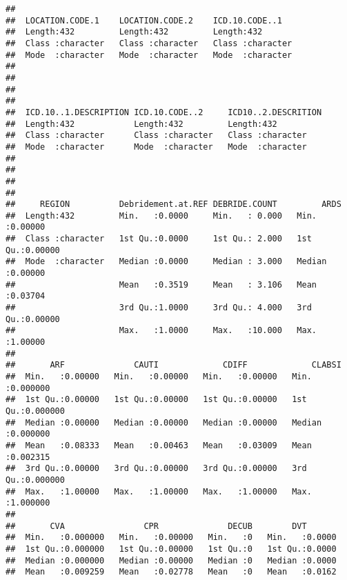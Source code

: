\documentclass[]{article}
\begin{document}
\begin{verbatim}
##                                                          
##  LOCATION.CODE.1    LOCATION.CODE.2    ICD.10.CODE..1    
##  Length:432         Length:432         Length:432        
##  Class :character   Class :character   Class :character  
##  Mode  :character   Mode  :character   Mode  :character  
##                                                          
##                                                          
##                                                          
##                                                          
##  ICD.10..1.DESCRIPTION ICD.10.CODE..2     ICD10..2.DESCRITION
##  Length:432            Length:432         Length:432         
##  Class :character      Class :character   Class :character   
##  Mode  :character      Mode  :character   Mode  :character   
##                                                              
##                                                              
##                                                              
##                                                              
##     REGION          Debridement.at.REF DEBRIDE.COUNT         ARDS        
##  Length:432         Min.   :0.0000     Min.   : 0.000   Min.   :0.00000  
##  Class :character   1st Qu.:0.0000     1st Qu.: 2.000   1st Qu.:0.00000  
##  Mode  :character   Median :0.0000     Median : 3.000   Median :0.00000  
##                     Mean   :0.3519     Mean   : 3.106   Mean   :0.03704  
##                     3rd Qu.:1.0000     3rd Qu.: 4.000   3rd Qu.:0.00000  
##                     Max.   :1.0000     Max.   :10.000   Max.   :1.00000  
##                                                                          
##       ARF              CAUTI             CDIFF             CLABSI        
##  Min.   :0.00000   Min.   :0.00000   Min.   :0.00000   Min.   :0.000000  
##  1st Qu.:0.00000   1st Qu.:0.00000   1st Qu.:0.00000   1st Qu.:0.000000  
##  Median :0.00000   Median :0.00000   Median :0.00000   Median :0.000000  
##  Mean   :0.08333   Mean   :0.00463   Mean   :0.03009   Mean   :0.002315  
##  3rd Qu.:0.00000   3rd Qu.:0.00000   3rd Qu.:0.00000   3rd Qu.:0.000000  
##  Max.   :1.00000   Max.   :1.00000   Max.   :1.00000   Max.   :1.000000  
##                                                                          
##       CVA                CPR              DECUB        DVT        
##  Min.   :0.000000   Min.   :0.00000   Min.   :0   Min.   :0.0000  
##  1st Qu.:0.000000   1st Qu.:0.00000   1st Qu.:0   1st Qu.:0.0000  
##  Median :0.000000   Median :0.00000   Median :0   Median :0.0000  
##  Mean   :0.009259   Mean   :0.02778   Mean   :0   Mean   :0.0162  

\end{verbatim}
\end{document}
